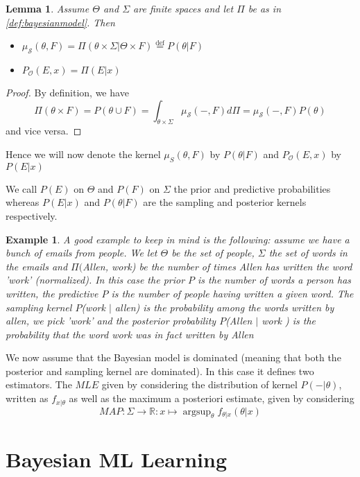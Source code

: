 \documentclass{book}
\theoremstyle{plain}
\newtheorem{example}[corollary]{Example}
\newtheorem{lemma}[corollary]{Lemma}
\theoremstyle{definition}
\DeclareMathOperator{\argsup}{argsup}
\renewcommand{\d}[1]{\mathbb{#1}}
\newcommand{\define}{\stackrel{\operatorname{def}}{=}}
\newcommand{\fun}{\mapsto}
\newcommand{\mor}{\longrightarrow}
\renewcommand{\r}[1]{\mathcal{#1}}
\renewcommand{\r}[1]{\mathcal{#1}}
\begin{document}
\begin{lemma}
Assume $\Theta$ and $\Sigma$ are finite spaces and let $\Pi$ be as in \ref{def:bayesianmodel}. Then
\begin{itemize}
\item $\mu_\r{S}(\theta,F)=\Pi(\theta\times \Sigma \vert \Theta\times F)\define P(\theta\vert F)$
\item $P_\r{O}(E,x)=\Pi(E\vert x)$
\end{itemize}
\end{lemma}

\begin{proof}
By definition, we have
\[
\Pi(\theta \times F)=P(\theta\cup F)=\int_{\theta\times \Sigma} \mu_\r{S}(-,F)d\Pi=\mu_\r{S}(-,F)P(\theta)
\]
and vice versa.	
\end{proof}

Hence we will now denote the kernel $\mu_{S}(\theta , F)$ by $P(\theta \vert F)$ and $P_\r{O}(E,x)$ by $P(E\vert x)$

We call $P(E)$ on $\Theta$ and $P(F)$ on $\Sigma$ the prior and predictive probabilities whereas $P(E\vert x)$ and $P(\theta\vert F)$ are the sampling and posterior kernels respectively.

\begin{example}
A good example to keep in mind is the following: assume we have a bunch of emails from people. We let $\Theta$ be the set of people, $\Sigma$ the set of words in the emails and $\Pi($Allen, work) be the number of times Allen has written the word 'work' (normalized). In this case the prior  $P$ is the number of words a person has written, the predictive $P$  is the number of people having written a given word. The sampling kernel $P$(work $\vert$ allen) is the probability among the words written by allen, we pick 'work' and the posterior probability $P$(Allen $\vert$ work ) is the probability that the word work was in fact written by Allen
\end{example}
 
We now assume that the Bayesian model is dominated (meaning that both the posterior and sampling kernel are dominated). 
In this case it defines two estimators. The $MLE$ given by considering the distribution of kernel $P(- \vert \theta)$, written as $f_{x\vert \theta}$ as well as the maximum a posteriori estimate, given by considering
\[
MAP: \Sigma \mor \d{R}: x \fun \argsup_\theta f_{\theta \vert x}(\theta \vert x)
\] 
 
\section{Bayesian ML Learning} 
 
\end{document}
